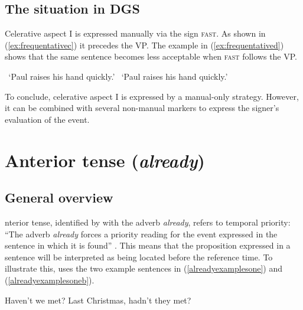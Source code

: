 \subsection{The situation in DGS}

Celerative aspect I is expressed manually via the sign \textsc{fast}. As shown in (\ref{ex:frequentativec}) it precedes the VP. The example in (\ref{ex:frequentatived}) shows that the same sentence becomes less acceptable when \textsc{fast} follows the VP. 

\begin{exe}
\ex\begin{xlist} 
\glt \textcolor{white}{?}`Paul raises his hand quickly.' \label{ex:frequentativec}
\glt \textcolor{white}{?}`Paul raises his hand quickly.'  \label{ex:frequentatived}
\end{xlist}
\end{exe} 

\noindent To conclude, celerative aspect I is expressed by a manual-only strategy. However, it can be combined with several non-manual markers to express the signer's evaluation of the event. 

\section{Anterior tense (\textit{already})}
\subsection{General overview}
nterior tense, identified by \citet[94]{cinque1999adverbs} with the adverb \textit{already}, refers to temporal priority: ``The adverb \textit{already} forces a priority reading for the event expressed in the sentence in which it is found'' \citep[547]{hornstein1977towards}. This means that the proposition expressed in a sentence will be interpreted as being located before the reference time. To illustrate this, \citet[94]{cinque1999adverbs} uses the two example sentences in (\ref{alreadyexamplesone}) and (\ref{alreadyexamplesoneb}).

\begin{exe}
\ex\label{alreadyexamplesone}\begin{xlist} 
\ex Haven't we met? \label{alreadyexampleaa}
\ex Last Christmas, hadn't they met? \label{alreadyexampleab}
\end{xlist}
\end{exe} 

